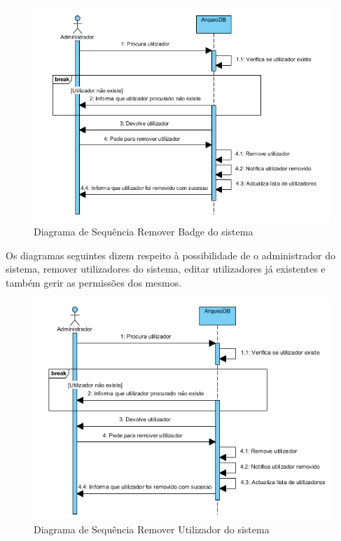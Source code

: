 \documentclass[12pt,a4paper]{article}
\begin{document}
\begin{figure}[h!]
\centering
\includegraphics[scale=1]{sequencia/A_removerlocal}
\caption{Diagrama de Sequência Remover Badge do sistema} 
\end{figure}

\clearpage
Os diagramas seguintes dizem respeito à possibilidade de o administrador do sistema, remover utilizadores do sistema, editar utilizadores já existentes e também gerir as permissões dos mesmos.\\

\begin{figure}[h!]
\centering
\includegraphics[scale=1]{sequencia/A_removerutilizador}
\caption{Diagrama de Sequência Remover Utilizador do sistema} 
\end{figure}  
\end{document}
